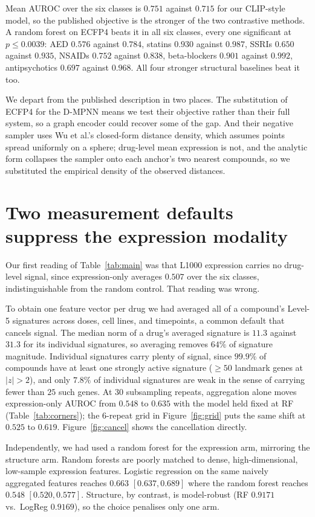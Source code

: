 \documentclass[conference]{IEEEtran}
\begin{document}
Mean AUROC over the six classes is $0.751$ against $0.715$ for our CLIP-style
model, so the published objective is the stronger of the two contrastive
methods. A random forest on ECFP4 beats it in all six
classes, every one significant at $p \le 0.0039$: AED $0.576$ against $0.784$,
statins $0.930$ against $0.987$, SSRIs $0.650$ against $0.935$, NSAIDs $0.752$
against $0.838$, beta-blockers $0.901$ against $0.992$, antipsychotics $0.697$
against $0.968$. All four stronger structural baselines beat it too.

We depart from the published description in two places. The
substitution of ECFP4 for the D-MPNN means we test their objective rather than
their full system, so a graph encoder could recover some of the gap. And their
negative sampler uses Wu et al.'s closed-form distance density, which assumes
points spread uniformly on a sphere; drug-level mean expression is not, and the
analytic form collapses the sampler onto each anchor's two nearest compounds, so
we substituted the empirical density of the observed distances.

\section{Two measurement defaults suppress the expression modality}
\label{sec:f2}

Our first reading of Table~\ref{tab:main} was that L1000 expression carries no
drug-level signal, since expression-only averages $0.507$ over the six classes,
indistinguishable from the random control. That reading was wrong.

To obtain one feature vector per drug we had averaged all of
a compound's Level-5 signatures across doses, cell lines, and timepoints, a
common default that cancels signal. The median norm of a drug's averaged
signature is $11.3$ against $31.3$ for its individual signatures, so averaging
removes $64\%$ of signature magnitude. Individual signatures carry plenty of
signal, since $99.9\%$ of compounds have at least one strongly active signature ($\ge 50$
landmark genes at $|z| > 2$), and only $7.8\%$ of individual signatures are weak
in the sense of carrying fewer than $25$ such genes.
At 30 subsampling repeats, aggregation alone moves expression-only AUROC from
$0.548$ to $0.635$ with the model held fixed at RF (Table~\ref{tab:corners});
the 6-repeat grid in Figure~\ref{fig:grid} puts the same shift at $0.525$ to
$0.619$. Figure~\ref{fig:cancel} shows the cancellation directly.

Independently, we had used a random forest for the
expression arm, mirroring the structure arm. Random forests are poorly matched to
dense, high-dimensional, low-sample expression features. Logistic regression on
the same naively aggregated features reaches $0.663$ $[0.637, 0.689]$
where the random forest reaches $0.548$ $[0.520, 0.577]$. Structure, by contrast,
is model-robust (RF $0.9171$ vs.\ LogReg $0.9169$), so the choice penalises only
one arm.
\end{document}
